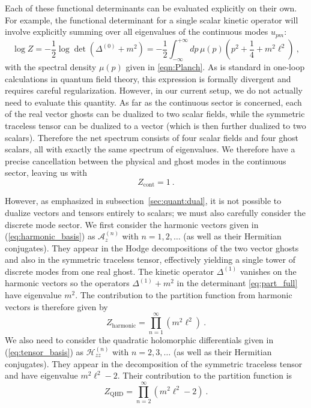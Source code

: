 \documentclass[12pt]{article}
\begin{document}
Each of these functional determinants can be evaluated explicitly on their own.  For example, 
the functional determinant for a single scalar kinetic operator will involve explicitly summing over all eigenvalues of the continuous modes $u_{p m}$:
\begin{equation}
	\log Z = -\frac{1}{2}\log \det\left(\Delta^{(0)} + m^2\right) = -\frac{1}{2}\int_{-\infty}^{+\infty} dp\, \mu(p) \left(p^2 + \frac{1}{4}+ m^2\ell^2\right)~,
\end{equation}
with the spectral density $\mu(p)$ given in \eqref{eqn:Planch}.
As is standard in one-loop calculations in quantum field theory, this expression is formally divergent and requires careful regularization.  However, in our current setup, we do not actually need to evaluate this quantity.  As far as the continuous sector is concerned, each of the real vector ghosts can be dualized to two scalar fields, while the symmetric traceless tensor can be dualized to a vector (which is then further dualized to two scalars).  Therefore the net spectrum consists of four scalar fields and four ghost scalars, all with exactly the same spectrum of eigenvalues.  We therefore have a precise cancellation between the physical and ghost modes in the continuous sector, leaving us with
\begin{equation}
	Z_\text{cont} = 1~.
\end{equation}

However, as emphasized in subsection~\ref{sec:quant:dual}, it is not possible to dualize vectors and tensors entirely to scalars; we must also carefully consider the discrete mode sector.  
We first consider the harmonic vectors given in (\ref{eq:harmonic_basis}) as $\mathcal{A}_z^{(n)}$ with $n = 1 , 2,\ldots$ (as well as their Hermitian conjugates).
They appear in the Hodge decompositions of the two vector ghosts and also in the symmetric traceless tensor, effectively yielding a single tower of discrete modes from one real ghost. The kinetic operator $\Delta^{(1)}$ vanishes on the harmonic vectors so the  operators  $\Delta^{(1)}+m^2$ in the determinant  \eqref{eq:part_full} have eigenvalue $m^2$.  The contribution to the partition function from harmonic vectors is therefore given by
%
\begin{equation}
	Z_\text{harmonic} = \prod_{n=1}^\infty \left(m^2 \ell^2\right)~.
\end{equation}
%
We also need to consider the quadratic holomorphic differentials given in (\ref{eq:tensor_basis}) as $\mathcal{H}^{(n)}_{zz}$ with $n = 2,3,\ldots$ (as well as their Hermitian conjugates). They appear in the decomposition of the symmetric traceless tensor and have eigenvalue $m^2\ell^2 - 2$. Their contribution to the partition function is
\begin{equation}
	Z_\text{QHD} = \prod_{n=2}^\infty \left(m^2 \ell^2 - 2\right)~.
\end{equation}
\end{document}
